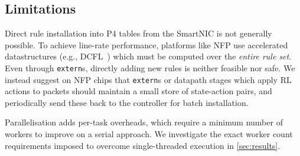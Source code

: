 \documentclass[
sigconf,natbib=false
,anonymous=true
,10pt
]{acmart}
\begin{document}
\subsection{Limitations}\label{sec:limitations}
Direct rule installation into P4 tables from the SmartNIC is not generally possible.
To achieve line-rate performance, platforms like NFP use accelerated datastructures (e.g., DCFL~\parencite{DBLP:conf/infocom/TaylorT05}) which must be computed over the \emph{entire rule set}.
Even through \texttt{extern}s, directly adding new rules is neither feasible nor safe.
We instead suggest on NFP chips that \texttt{extern}s or datapath stages which apply RL actions to packets should maintain a small store of state-action pairs, and periodically send these back to the controller for batch installation.

Parallelisation adds per-task overheads, which require a minimum number of workers to improve on a serial approach.
We investigate the exact worker count requirements imposed to overcome single-threaded execution in \cref{sec:results}.
\end{document}
